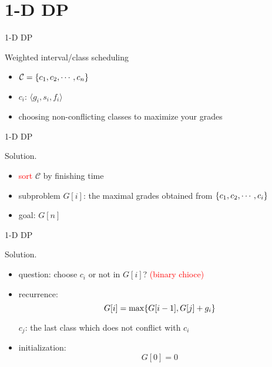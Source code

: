 \section{1-D DP}

\begin{frame}{1-D DP}
  \begin{exampleblock}{Weighted interval/class scheduling }
    \begin{itemize}
      \item $\mathcal{C} = \{c_{1}, c_{2}, \cdots, c_{n}\}$
      \item $c_{i}$: $\langle g_{i}, s_{i}, f_{i} \rangle$
      \item choosing non-conflicting classes to maximize your grades
    \end{itemize}

  \end{exampleblock}
\end{frame}
\begin{frame}{1-D DP}
  \begin{block}{Solution.}
    \begin{itemize}
      \item \textcolor{red}{sort} $\mathcal{C}$ by finishing time
      \item subproblem $G[i]$: the maximal grades obtained from $\{c_{1}, c_{2}, \cdots, c_{i}\}$
      \item goal: $G[n]$
    \end{itemize}
  \end{block}
\end{frame}
\begin{frame}{1-D DP}
  \begin{block}{Solution.}
    \begin{itemize}
      \item question: choose $c_{i}$ or not in $G[i]$? {\footnotesize \textcolor{red}{(binary chioce)}}
      \item recurrence: 
	\[
	  G[i] = \max \{G[i-1], G[j] + g_{i}\}
	\]
	
	$c_{j}$: the last class which does not conflict with $c_{i}$
      
      \item<3-> initialization:
	\[
	  G[0] = 0
	\]
    \end{itemize}
  \end{block}
\end{frame}
